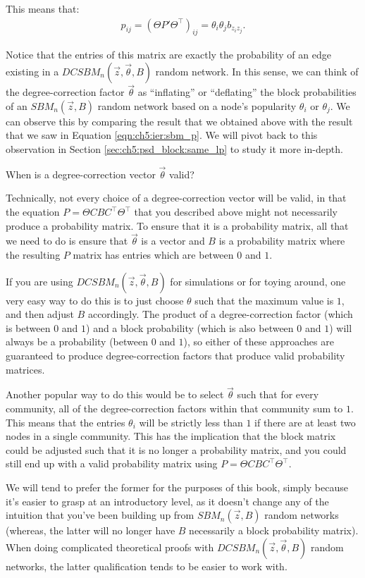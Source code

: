This means that:
\begin{align*}
    p_{ij} = (\Theta P' \Theta^\top)_{ij} = \theta_i \theta_j b_{z_i z_j}.
\end{align*}

Notice that the entries of this matrix are exactly the probability of an edge existing in a $DCSBM_n(\vec z, \vec \theta, B)$ random network. In this sense, we can think of the degree-correction factor $\vec \theta$ as ``inflating'' or ``deflating'' the block probabilities of an $SBM_n(\vec z, B)$ random network based on a node's popularity $\theta_i$ or $\theta_j$. We can observe this by comparing the result that we obtained above with the result that we saw in Equation \eqref{eqn:ch5:ier:sbm_p}. We will pivot back to this observation in Section \ref{sec:ch5:psd_block:same_lp} to study it more in-depth.

\begin{floatingbox}[h]\caption{When is a degree-correction vector $\vec \theta$ valid?}
Technically, not every choice of a degree-correction vector will be valid, in that the equation $P = \Theta CBC^\top \Theta^\top$ that you described above might not {necessarily} produce a probability matrix. To ensure that it is a probability matrix, all that we need to do is ensure that $\vec\theta$ is a vector and $B$ is a probability matrix where the resulting $P$ matrix has entries which are between $0$ and $1$.

If you are using $DCSBM_n(\vec z, \vec \theta, B)$ for simulations or for toying around, one very easy way to do this is to just choose $\theta$ such that the maximum value is $1$, and then adjust $B$ accordingly. The product of a degree-correction factor (which is between $0$ and $1$) and a block probability (which is also between $0$ and $1$) will always be a probability (between $0$ and $1$), so either of these approaches are guaranteed to produce degree-correction factors that produce valid probability matrices.

 Another popular way to do this \cite{Karrer2011Jan,Qin2013Sep} would be to select $\vec \theta$ such that for every community, all of the degree-correction factors within that community sum to $1$. This means that the entries $\theta_i$ will be strictly less than $1$ if there are at least two nodes in a single community. This has the implication that the block matrix could be adjusted such that it is no longer a probability matrix, and you could still end up with a valid probability matrix using $P = \Theta C B C^\top \Theta^\top$. 
 
 We will tend to prefer the former for the purposes of this book, simply because it's easier to grasp at an introductory level, as it doesn't change any of the intuition that you've been building up from $SBM_n(\vec z, B)$ random networks (whereas, the latter will no longer have $B$ necessarily a block probability matrix). When doing complicated theoretical proofs with $DCSBM_n(\vec z, \vec\theta, B)$ random networks, the latter qualification tends to be easier to work with.
\end{floatingbox}

